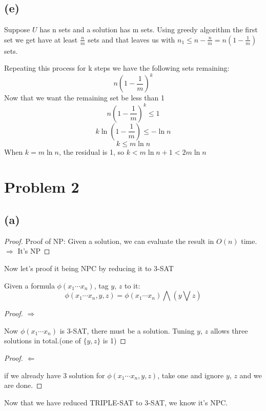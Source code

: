 \documentclass{article}
\begin{document}
\subsection*{(e)}
	\par Suppose $U$ has n sets and a solution has m sets. Using greedy algorithm the first set we get have at least $\frac{n}{m}$ sets and that leaves us with $n_1 \leq n - \frac{n}{m} = n(1  - \frac{1}{m})$ sets.
	\par Repeating this process for k steps we have the following sets remaining:
		$$ n(1-\frac{1}{m})^k$$
	Now that we want the remaining set be less than 1
	$$ n(1-\frac{1}{m})^k \leq 1 $$
	$$ k \ln(1-\frac{1}{m}) \leq -\ln n$$
	$$ k \leq m \ln n  $$
	When $k = m \ln n$, the residual is 1, so $k < m \ln n + 1 < 2m\ln n$
\section*{Problem 2}
\subsection*{(a)}
	\begin{proof} Proof of NP:
	Given a solution, we can evaluate the result in $O(n)$ time. $\Rightarrow$ It's NP
	\end{proof}
	\par Now let's proof it being NPC by reducing it to 3-SAT
	\par Given a formula $\phi(x_1 \cdots x_n)$, tag $y$, $z$ to it:
	$$\phi(x_1 \cdots x_n, y, z) = \phi(x_1 \cdots x_n) \bigwedge (y \bigvee z)$$
	\begin{proof} $\Rightarrow$
	\par Now $\phi(x_1 \cdots x_n)$ is 3-SAT, there must be a solution. Tuning $y$, $z$ allows three solutions in total.(one of $\{y, z\}$ is 1)
	\end{proof}
	\begin{proof} $\Leftarrow$
	\par if we already have 3 solution for $\phi(x_1 \cdots x_n, y, z)$, take one and ignore $y$, $z$ and we are done.
	\end{proof}
	Now that we have reduced TRIPLE-SAT to 3-SAT, we know it's NPC.
\end{document}
